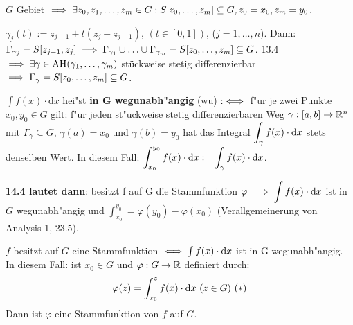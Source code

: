 \documentclass[a4paper,twoside,DIV15,BCOR12mm]{scrbook}
\begin{document}
\begin{beweis}
$G$ Gebiet $\implies \exists z_0,z_1,\ldots,z_m \in G: S[z_0,\ldots,z_m]\subseteq G, z_0=x_0, z_m = y_0$.

$\gamma_j(t) := z_{j-1} + t(z_j - z_{j-1})$, $(t\in[0,1])$, ($j=1,\ldots,n$). Dann:$\Gamma_{\gamma_j} = S[z_{j-1},z_{j}] \implies \Gamma_{\gamma_1}\cup\ldots\cup\Gamma_{\gamma_m} = S[z_0,\ldots,z_m] \subseteq G$. 13.4 $\implies \exists \gamma \in \text{AH}(\gamma_1,\ldots,\gamma_m)$ stückweise stetig differenzierbar $\implies \Gamma_{\gamma} = S[z_0,\ldots,z_m] \subseteq G$. 
\end{beweis}

\begin{definition*}
$\int f(x)\cdot \text{d}x$ hei"st \textbf{in G wegunabh"angig} (wu) $:\iff$ f"ur je zwei Punkte $x_0, y_0\in G$ gilt: f"ur jeden st"uckweise stetig differenzierbaren Weg $\gamma:[a,b]\to\mathbb{R}^n$ mit $\Gamma_\gamma\subseteq G$, $\gamma(a)=x_0$ und $\gamma(b)=y_0$ hat das Integral $\displaystyle\int_\gamma f(x)\cdot\text{d}x$ stets denselben Wert. In diesem Fall: $\displaystyle\int_{x_0}^{y_0}f(x)\cdot\text{d}x:=\displaystyle\int_\gamma f(x)\cdot\text{d}x$.
\end{definition*}

\textbf{14.4 lautet dann}: besitzt f auf G die Stammfunktion $\varphi\implies \displaystyle\int f(x)\cdot\text{d}x$ ist in $G$ wegunabh"angig und $\int_{x_0}^{y_0}=\varphi(y_0)-\varphi(x_0)$ (Verallgemeinerung von Analysis 1, 23.5).

\begin{satz}
$f$ besitzt auf $G$ eine Stammfunktion $\iff\int f(x)\cdot\text{d}x$ ist in G wegunabh"angig. \\
In diesem Fall: ist $x_0\in G$ und $\varphi:G\to\mathbb{R}$ definiert durch: 
$$\varphi(z)=\displaystyle\int_{x_0}^z f(x)\cdot\text{d}x\ (z\in G)\ (*)$$Dann ist $\varphi$ eine Stammfunktion von $f$ auf $G$.
\end{satz}
\end{document}
